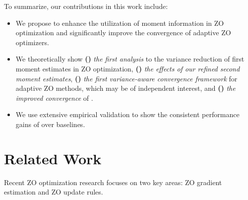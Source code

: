 To summarize, our contributions in this work include:
\begin{itemize}[topsep=0pt,leftmargin=3mm,itemsep=-2pt]
\item We propose \ours{} to enhance the utilization of moment information in ZO optimization and significantly improve the convergence of adaptive ZO optimizers.
\item We theoretically show \textbf{()} \textit{the first analysis} to the variance reduction of first moment estimates in ZO optimization, \textbf{()} \textit{the effects of our refined second moment estimates}, \textbf{()} \textit{the first variance-aware convergence framework} for adaptive ZO methods, which may be of independent interest, and \textbf{()} \textit{the improved convergence} of \ours{}.
\item We use extensive empirical validation to show the consistent performance gains of \ours{} over baselines.
\end{itemize} 

\section{Related Work}
Recent ZO optimization research focuses on two key areas: ZO gradient estimation and ZO update rules. 

